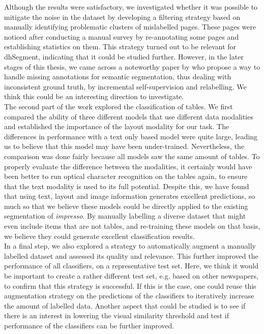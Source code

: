 Although the results were satisfactory, we investigated whether it was possible to mitigate the noise in the dataset by developing a filtering strategy based on manually identifying problematic clusters of mislabelled pages. These pages were noticed after conducting a manual survey by re-annotating some pages and establishing statistics on them. This strategy turned out to be relevant for dhSegment, indicating that it could be studied further. However, in the later stages of this thesis, we came across a noteworthy paper by \citet{petit_handling_2018} who propose a way to handle missing annotations for semantic segmentation, thus dealing with inconsistent ground truth, by incremental self-supervision and relabelling. We think this could be an interesting direction to investigate.\\

The second part of the work explored the classification of tables. We first compared the ability of three different models that use different data modalities and established the importance of the layout modality for our task. The differences in performance with a text only based model were quite large, leading us to believe that this model may have been under-trained. Nevertheless, the comparison was done fairly because all models saw the same amount of tables. To properly evaluate the difference between the modalities, it certainly would have been better to run optical character recognition on the tables again, to ensure that the text modality is used to its full potential. Despite this, we have found that using text, layout and image information generates excellent predictions, so much so that we believe these models could be directly applied to the existing segmentation of \textit{impresso}. By manually labelling a diverse dataset that might even include items that are not tables, and re-training these models on that basis, we believe they could generate excellent classification results. \\
In a final step, we also explored a strategy to automatically augment a manually labelled dataset and assessed its quality and relevance. This further improved the performance of all classifiers, on a representative test set. Here, we think it would be important to create a rather different test set, e.g. based on other newspapers, to confirm that this strategy is successful. If this is the case, one could reuse this augmentation strategy on the predictions of the classifiers to iteratively increase the amount of labelled data. Another aspect that could be studied is to see if there is an interest in lowering the visual similarity threshold and test if performance of the classifiers can be further improved. \\

